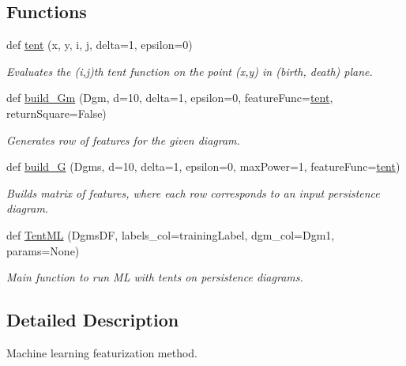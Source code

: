 \subsection*{Functions}
\begin{DoxyCompactItemize}
\item 
def \hyperlink{namespaceteaspoon_1_1_m_l_1_1tents_a7e54522bba1f674736551ec0522828fa}{tent} (x, y, i, j, delta=1, epsilon=0)
\begin{DoxyCompactList}\small\item\em Evaluates the (i,j)th tent function on the point (x,y) in (birth, death) plane. \end{DoxyCompactList}\item 
def \hyperlink{namespaceteaspoon_1_1_m_l_1_1tents_ac230b402d60eb765d2c2776027afaaa9}{build\+\_\+\+Gm} (Dgm, d=10, delta=1, epsilon=0, feature\+Func=\hyperlink{namespaceteaspoon_1_1_m_l_1_1tents_a7e54522bba1f674736551ec0522828fa}{tent}, return\+Square=False)
\begin{DoxyCompactList}\small\item\em Generates row of features for the given diagram. \end{DoxyCompactList}\item 
def \hyperlink{namespaceteaspoon_1_1_m_l_1_1tents_a19cc99365f3d375bf1ea7535095c15e3}{build\+\_\+G} (Dgms, d=10, delta=1, epsilon=0, max\+Power=1, feature\+Func=\hyperlink{namespaceteaspoon_1_1_m_l_1_1tents_a7e54522bba1f674736551ec0522828fa}{tent})
\begin{DoxyCompactList}\small\item\em Builds matrix of features, where each row corresponds to an input persistence diagram. \end{DoxyCompactList}\item 
def \hyperlink{namespaceteaspoon_1_1_m_l_1_1tents_aedb3c3fb1a8c0faa8bbe358db170f5bb}{Tent\+ML} (Dgms\+DF, labels\+\_\+col=\textquotesingle{}training\+Label\textquotesingle{}, dgm\+\_\+col=\textquotesingle{}Dgm1\textquotesingle{}, params=None)
\begin{DoxyCompactList}\small\item\em Main function to run ML with tents on persistence diagrams. \end{DoxyCompactList}\end{DoxyCompactItemize}


\subsection{Detailed Description}
Machine learning featurization method. 

